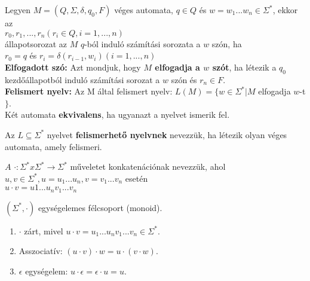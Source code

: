 \begin{frame}
\begin{tcolorbox}[squeezed title={Def.: Számítási sorozat, elfogadott szó, felismert nyelv}]
Legyen $M = (Q, {\Sigma}, {\delta}, q_0, F)$ véges automata, $q \in Q$ és $w = w_1...w_n \in {\Sigma}^*$, ekkor az\\
\mmedskip
$r_0, r_1, ..., r_n (r_i \in Q, i = 1, ..., n)$\\
\mmedskip
állapotsorozat az $M$ $q$-ból induló számítási sorozata a $w$ szón, ha\\
\mmedskip
$r_0 = q$ és $r_i = {\delta}(r_{i - 1}, w_i)(i = 1, ..., n)$\\
\mbigskip
\textbf{Elfogadott szó:} Azt mondjuk, hogy \textbf{$M$ elfogadja a $w$ szót}, ha létezik a $q_0$ kezdőállapotból induló számítási sorozat a $w$ szón és $r_n \in F$.\\
\mbigskip
\textbf{Felismert nyelv:} Az M által felismert nyelv: $L(M) = \{w \in {\Sigma}^* | M$ elfogadja $w$-t$\}$.\\
\mbigskip
Két automata \textbf{ekvivalens}, ha ugyanazt a nyelvet ismerik fel.
\end{tcolorbox}

\begin{tcolorbox}[title={Def.: Felismerhető nyelv}]
Az $L \subseteq {\Sigma}^*$ nyelvet \textbf{felismerhető nyelvnek} nevezzük, ha létezik olyan véges automata, amely felismeri.
\end{tcolorbox}

\begin{tcolorbox}[title={Def.: Konkatenáció}]
$A$ $\cdot : {\Sigma}^* x {\Sigma}^* \rightarrow {\Sigma}^*$ műveletet konkatenációnak nevezzük, ahol\\
\mmedskip
$u, v \in {\Sigma}^*, u = u_1...u_n, v = v_1...v_n$ esetén\\
$u \cdot v = u1...u_nv_1...v_n$
\end{tcolorbox}

\begin{tcolorbox}[title={Ész}]
$({\Sigma}^*, {\cdot})$ egységelemes félcsoport (monoid).\\
\begin{enumerate}
\item $\cdot$ zárt, mivel $u \cdot v = u_1...u_nv_1...v_n \in {\Sigma}^*$.
\item Asszociatív: $(u \cdot v) \cdot w = u \cdot (v \cdot w)$.
\item $\epsilon$ egységelem: $u \cdot \epsilon = \epsilon \cdot u = u$.
\end{enumerate}
\end{tcolorbox}

\end{frame}

